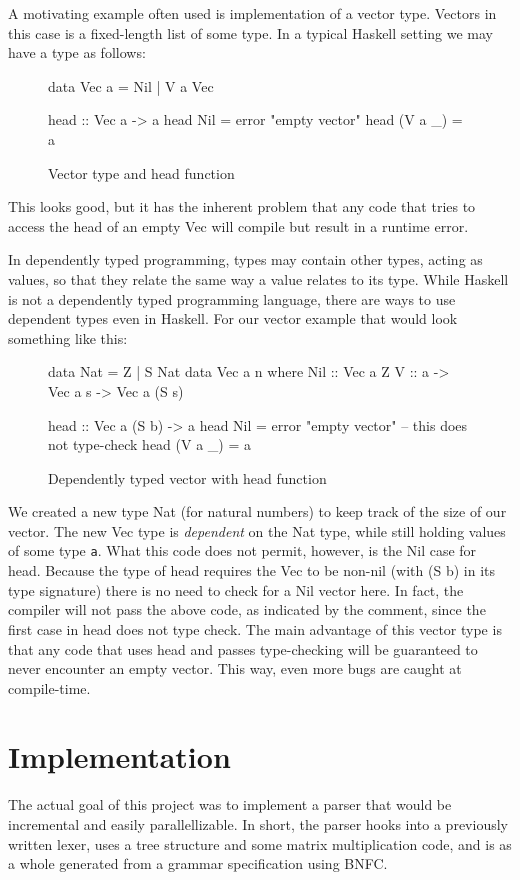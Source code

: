 \documentclass[a4paper,12pt,twosided]{report}
\begin{document}
A motivating example often used is implementation of a vector type. Vectors in
this case is a fixed-length list of some type. In a typical Haskell setting we 
may have a type as follows:
\begin{figure}[H]
\begin{code}
data Vec a = Nil | V a Vec

head :: Vec a -> a
head Nil = error "empty vector"
head (V a _) = a
\end{code}
\caption{Vector type and head function}
\end{figure}
This looks good, but it has the inherent problem that any code that tries to
access the head of an empty Vec will compile but result in a runtime error. 

In dependently typed programming, types may contain other types, acting as
values, so that they relate the same way a value relates to its type. While
Haskell is not a dependently typed programming language, there are ways to use
dependent types even in Haskell. For our vector example that would look
something like this:
\begin{figure}[H]
\begin{code}
data Nat = Z | S Nat
data Vec a n where
    Nil :: Vec a Z
    V :: a -> Vec a s -> Vec a (S s)

head :: Vec a (S b) -> a
head Nil = error "empty vector" -- this does not type-check
head (V a _) = a
\end{code}
\caption{Dependently typed vector with head function}
\end{figure}
We created a new type Nat (for natural numbers) to keep track of the size of our
vector. The new Vec type is \textit{dependent} on the Nat type, while still
holding values of some type \texttt{a}. What this code does not permit, however,
is the Nil case for head. Because the type of head requires the Vec to be
non-nil (with (S b) in its type signature) there is no need to check for a Nil
vector here. In fact, the compiler will not pass the above code, as indicated by
the comment, since the first case in head does not type check. The main
advantage of this vector type is that any code that uses head and passes
type-checking will be guaranteed to never encounter an empty vector.  This way,
even more bugs are caught at compile-time.

%
%

\chapter{Implementation}
The actual goal of this project was to implement a parser that would be
incremental and easily parallellizable. In short, the parser hooks into a
previously written lexer, uses a tree structure and some matrix multiplication
code, and is as a whole generated from a grammar specification using BNFC.
\end{document}
